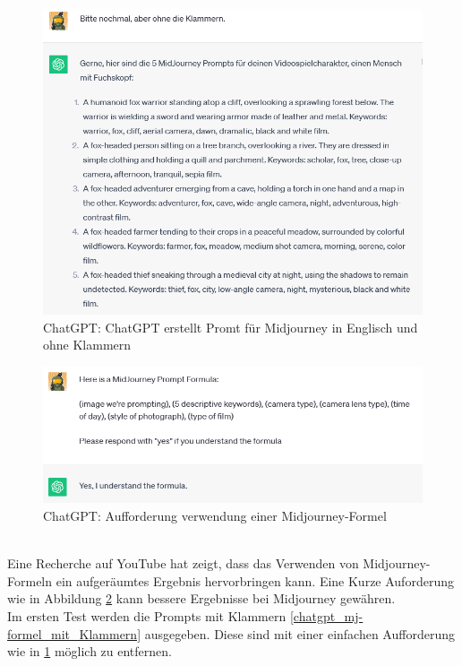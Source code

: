 \begin{figure}[h]
	\centering
	\includegraphics[scale=0.7]{BilderFuerBA/06.png}
	\caption{ChatGPT: ChatGPT erstellt Promt für Midjourney in Englisch und ohne Klammern}
	\label{chatgpt_mj-formel_ohne_Klammern}
\end{figure}
\begin{figure}[h]
	\centering
	\includegraphics[width=14cm]{BilderFuerBA/04.png}
	\caption{ChatGPT: Aufforderung verwendung einer Midjourney-Formel}
	\label{chatgpt-ptompt-Midjourney-04}
\end{figure}
\\
Eine Recherche auf YouTube hat zeigt, dass das Verwenden von Midjourney-Formeln ein aufgeräumtes Ergebnis hervorbringen kann. Eine Kurze Auforderung wie in Abbildung \ref{chatgpt-ptompt-Midjourney-04} kann bessere Ergebnisse bei Midjourney gewähren.
\\
Im ersten Test werden die Prompts mit Klammern \ref{chatgpt_mj-formel_mit_Klammern} ausgegeben. Diese sind mit einer einfachen Aufforderung wie in \ref{chatgpt_mj-formel_ohne_Klammern} möglich zu entfernen.
